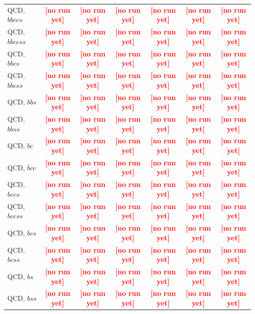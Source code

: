 \documentclass[12pt]{article}   %
\newcommand{\pending}[1]{\textcolor{red}{\textbf{[#1]}}}
\begin{document}
\begin{landscape}
{\begin{longtable}{@{\extracolsep{\fill}}lcccccc@{}}
QCD, $bbccs$ & \pending{no run yet} & \pending{no run yet} & \pending{no run yet} & \pending{no run yet} & \pending{no run yet} & \pending{no run yet} \\
QCD, $bbccss$ & \pending{no run yet} & \pending{no run yet} & \pending{no run yet} & \pending{no run yet} & \pending{no run yet} & \pending{no run yet} \\
QCD, $bbcs$ & \pending{no run yet} & \pending{no run yet} & \pending{no run yet} & \pending{no run yet} & \pending{no run yet} & \pending{no run yet} \\
QCD, $bbcss$ & \pending{no run yet} & \pending{no run yet} & \pending{no run yet} & \pending{no run yet} & \pending{no run yet} & \pending{no run yet} \\
QCD, $bbs$ & \pending{no run yet} & \pending{no run yet} & \pending{no run yet} & \pending{no run yet} & \pending{no run yet} & \pending{no run yet} \\
QCD, $bbss$ & \pending{no run yet} & \pending{no run yet} & \pending{no run yet} & \pending{no run yet} & \pending{no run yet} & \pending{no run yet} \\
QCD, $bc$ & \pending{no run yet} & \pending{no run yet} & \pending{no run yet} & \pending{no run yet} & \pending{no run yet} & \pending{no run yet} \\
QCD, $bcc$ & \pending{no run yet} & \pending{no run yet} & \pending{no run yet} & \pending{no run yet} & \pending{no run yet} & \pending{no run yet} \\
QCD, $bccs$ & \pending{no run yet} & \pending{no run yet} & \pending{no run yet} & \pending{no run yet} & \pending{no run yet} & \pending{no run yet} \\
QCD, $bccss$ & \pending{no run yet} & \pending{no run yet} & \pending{no run yet} & \pending{no run yet} & \pending{no run yet} & \pending{no run yet} \\
QCD, $bcs$ & \pending{no run yet} & \pending{no run yet} & \pending{no run yet} & \pending{no run yet} & \pending{no run yet} & \pending{no run yet} \\
QCD, $bcss$ & \pending{no run yet} & \pending{no run yet} & \pending{no run yet} & \pending{no run yet} & \pending{no run yet} & \pending{no run yet} \\
QCD, $bs$ & \pending{no run yet} & \pending{no run yet} & \pending{no run yet} & \pending{no run yet} & \pending{no run yet} & \pending{no run yet} \\
QCD, $bss$ & \pending{no run yet} & \pending{no run yet} & \pending{no run yet} & \pending{no run yet} & \pending{no run yet} & \pending{no run yet} \\

\end{longtable}}
\end{landscape}
\end{document}
